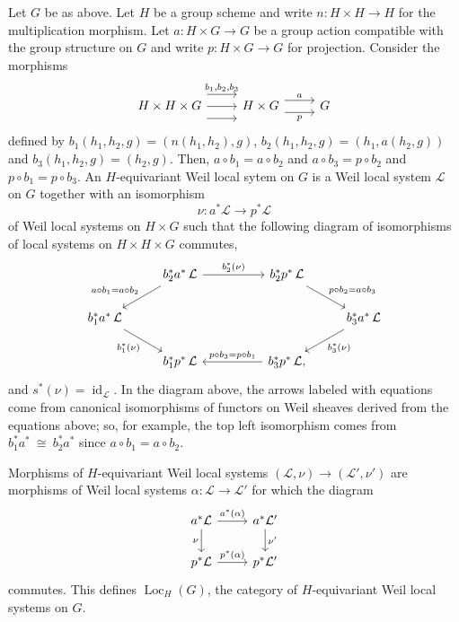 \documentclass[10pt]{amsart}
\theoremstyle{plain}
\theoremstyle{definition}
\DeclareMathOperator{\id}{id}
\DeclareMathOperator{\Loc}{Loc}
\newcommand{\iso}{{\ \cong\ }}
\newcommand{\cs}[1]{{\mathcal{#1}}}
\begin{document}
Let $G$ be as above.
Let $H$ be a group scheme and write $n : H \times H \to H$ for the multiplication morphism.
Let $a : H \times G\to G$ be a group action compatible with the group structure on $G$ and write $p : H\times G \to G$ for projection. 
Consider the morphisms
\[
\begin{tikzcd}
H \times H \times G 
\arrow[shift left=4]{r}{b_1, b_2, b_3} 
\arrow{r}{}
\arrow[shift right=4]{r}{} 
& H \times G 
\arrow[shift left=2]{r}{a}
\arrow[shift right=2]{r}[swap]{p}
 & G 
\end{tikzcd}
\]
defined by $b_1(h_1,h_2,g) = (n(h_1,h_2),g)$,  $b_2(h_1,h_2,g) = (h_1,a(h_2,g))$ and $b_3(h_1,h_2,g) = (h_2,g)$.
Then, $a\circ b_1 = a\circ b_2$ and $a\circ b_3 = p\circ b_2$ and $p\circ b_1 = p\circ b_3$.
An $H$-equivariant Weil local sytem on $G$ is a Weil local system $\cs{L}$ on $G$ together with an isomorphism  
\[
\nu : a^*\cs{L} \to p^*\cs{L}
\] 
of Weil local systems on $H\times G$ such that the following diagram of isomorphisms of local systems on $H\times H\times G$ commutes,
\[
\begin{tikzcd}
\ &  \arrow{dl}[swap]{a\circ b_1 = a\circ b_2}  b_2^*  a^*\, \mathcal{L} \arrow{rr}{b_2^*(\nu)} && b_2^* p^*\, \mathcal{L} \arrow{dr}{p\circ b_2 = a\circ b_3} & \\
b_1^* a^*\, \mathcal{L} \arrow{dr}[swap]{b_1^*(\nu)} &&&&   \arrow{dl}{b_3^*(\nu)} b_3^* a^*\, \mathcal{L} \\
& b_1^* p^*\, \mathcal{L}  && \arrow{ll}[swap]{p\circ b_3 = p\circ b_1} b_3^* p^*\, \mathcal{L}, & 
\end{tikzcd}
\]
and $s^*(\nu) = \id_{\cs{L}}$.
In the diagram above, the arrows labeled with equations come from canonical isomorphisms of functors on Weil sheaves derived from the equations above; so, for example, the top left isomorphism comes from $b_1^* a^* \iso b_2^* a^*$ since $a\circ b_1 = a\circ b_2$.
\iffalse
On stalks, this condition is ...
\[
\begin{tikzcd}
\ &  \cs{L}_{h_1\cdot(h_2\cdot g)} \arrow{r}{\nu_{h_1,h_2\cdot g}} & \cs{L}_{h_2\cdot g} & \\
\cs{L}_{(h_1 h_2) \cdot g} \arrow{dr}[swap]{\nu_{(h_1h_2),g}} \arrow[equal]{ur} &&& \arrow[equal]{ul}  \arrow{dl}{\nu_{h_2,g}} \cs{L}_{h_2\cdot g} \\
& \cs{L}_g \arrow[equal]{r} & \cs{L}_g & 
\end{tikzcd}
\]
\fi
Morphisms of $H$-equivariant Weil local systems $(\cs{L},\nu)\to (\cs{L}',\nu')$ are morphisms of Weil local systems $\alpha: \cs{L}\to \cs{L}'$ for which the diagram
\[
\begin{tikzcd}
\arrow{d}[swap]{\nu} a^*\cs{L} \arrow{r}{a^*(\alpha)} & a^*\cs{L}' \arrow{d}{\nu'} \\
p^*\cs{L} \arrow{r}{p^*(\alpha)} & p^*\cs{L}'
\end{tikzcd}
\]
commutes.
This defines $\Loc_H(G)$, the category of $H$-equivariant Weil local systems on $G$.
\end{document}
